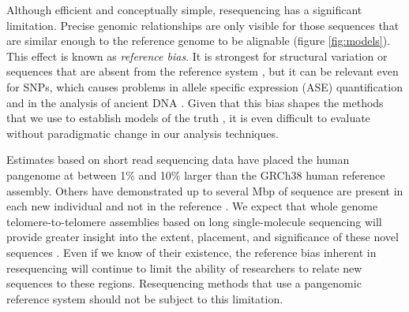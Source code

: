 Although efficient and conceptually simple, resequencing has a significant limitation.
Precise genomic relationships are only visible for those sequences that are similar enough to the reference genome to be alignable (figure \ref{fig:models}).
This effect is known as \emph{reference bias}.
It is strongest for structural variation or sequences that are absent from the reference system \cite{sudmant2015integrated}, but it can be relevant even for SNPs, which causes problems in allele specific expression (ASE) quantification \cite{Castel2015-ef} and in the analysis of ancient DNA \cite{zhou2017antcaller}.
Given that this bias shapes the methods that we use to establish models of the truth \cite{zook2014integrating}, it is even difficult to evaluate without paradigmatic change in our analysis techniques.


Estimates based on short read sequencing data have placed the human pangenome at between 1\% \cite{li2010building} and 10\% \cite{sherman2019assembly} larger than the GRCh38 human reference assembly.
Others have demonstrated up to several Mbp of sequence are present in each new individual and not in the reference \cite{Hehir-Kwa2016-hb,Audano_2019}.
We expect that whole genome telomere-to-telomere assemblies based on long single-molecule sequencing will provide greater insight into the extent, placement, and significance of these novel sequences \cite{miga2019telomere,Langley_2019}.
Even if we know of their existence, the reference bias inherent in resequencing will continue to limit the ability of researchers to relate new sequences to these regions.
Resequencing methods that use a pangenomic reference system should not be subject to this limitation.

